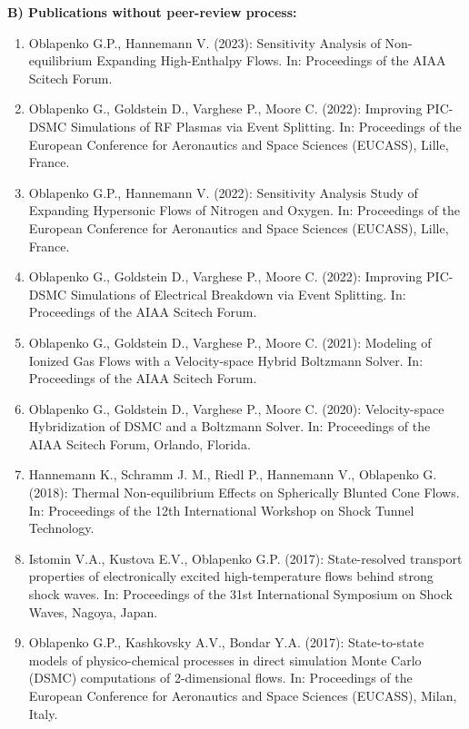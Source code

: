 \documentclass{resume} %
\begin{document}
{\bf B) Publications without peer-review process:}
\begin{enumerate}

    
    \item {Oblapenko G.P., Hannemann V.} (2023): Sensitivity Analysis of Non-equilibrium Expanding High-Enthalpy Flows. In: Proceedings of the AIAA Scitech Forum.

    \item {Oblapenko G., Goldstein D., Varghese P., Moore C.} (2022): Improving PIC-DSMC Simulations of RF Plasmas via Event Splitting. In: Proceedings of the European Conference for Aeronautics and Space Sciences (EUCASS), Lille, France.

    \item {Oblapenko G.P., Hannemann V.} (2022): Sensitivity Analysis Study of Expanding Hypersonic Flows of Nitrogen and Oxygen. In: Proceedings of the European Conference for Aeronautics and Space Sciences (EUCASS), Lille, France.

    \item {Oblapenko G., Goldstein D., Varghese P., Moore C.} (2022): Improving PIC-DSMC Simulations of Electrical Breakdown via Event Splitting. In: Proceedings of the AIAA Scitech Forum.
    
    \item {Oblapenko G., Goldstein D., Varghese P., Moore C.} (2021): Modeling of Ionized Gas Flows with a Velocity-space Hybrid Boltzmann Solver. In: Proceedings of the AIAA Scitech Forum.
    
    \item {Oblapenko G., Goldstein D., Varghese P., Moore C.} (2020): Velocity-space Hybridization of DSMC and a Boltzmann Solver. In: Proceedings of the AIAA Scitech Forum, Orlando, Florida.

    \item {Hannemann K., Schramm J. M., Riedl P., Hannemann V., { Oblapenko G.}} (2018): Thermal Non-equilibrium Effects on Spherically Blunted Cone Flows. In: Proceedings of the 12th International Workshop on Shock Tunnel Technology.
    
    \item Istomin V.A., Kustova E.V., {Oblapenko G.P.} (2017): State-resolved transport properties of electronically excited high-temperature flows behind strong shock waves. In: Proceedings of the 31st International Symposium on Shock Waves, Nagoya, Japan.
    
    \item {{Oblapenko G.P.}, Kashkovsky A.V., Bondar Y.A.} (2017): State-to-state models of physico-chemical processes in direct simulation Monte Carlo (DSMC) computations of 2-dimensional flows. In: Proceedings of the European Conference for Aeronautics and Space Sciences (EUCASS), Milan, Italy.


\end{enumerate}
\end{document}

